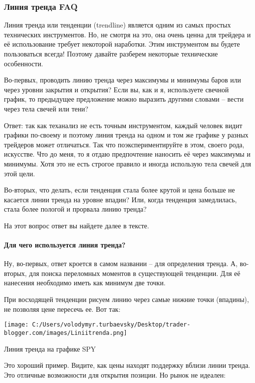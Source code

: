 \documentclass[a5paper]{article}
\begin{document}
\subsubsection{Линия тренда FAQ }

Линия тренда или тенденции (trendline) является одним из самых простых технических инструментов. Но, не смотря на это, она очень ценна для трейдера и её использование требует некоторой наработки. Этим инструментом вы будете пользоваться всегда! Поэтому давайте разберем некоторые технические особенности.

Во-первых, проводить линию тренда через максимумы и минимумы баров или через уровни закрытия и открытия? Если вы, как и я, используете свечной график, то предыдущее предложение можно выразить другими словами – вести через тела свечей или тени?

Ответ: так как теханализ не есть точным инструментом, каждый человек видит графики по-своему и поэтому линия тренда  на одном и том же графике у разных трейдеров может отличаться. Так что поэкспериментируйте в этом, своего рода, искусстве. Что до меня, то я отдаю предпочтение наносить её через максимумы и минимумы. Хотя это не есть строгое правило и иногда использую тела свечей для этой цели.

Во-вторых,  что делать, если тенденция стала более крутой и цена больше не касается линии тренда на уровне впадин? Или, когда тенденция замедлилась, стала более пологой и прорвала линию тренда?

На этот вопрос ответ вы найдете далее в тексте.

\paragraph{Для чего используется линия тренда?}

Ну, во-первых, ответ кроется в самом названии – для определения тренда. А, во-вторых, для поиска переломных моментов в существующей тенденции. Для её нанесения необходимо иметь как минимум две точки.

При восходящей тенденции рисуем линию через самые нижние точки
(впадины), не позволяя цене пересечь ее. Вот так:

\texttt{[image: C:/Users/volodymyr.turbaevsky/Desktop/trader-blogger.com/images/Liniitrenda.png]}

Линия тренда на графике SPY

Это хороший пример. Видите, как цены находят поддержку вблизи линии
тренда. Это отличные возможности для открытия позиции. Но рынок не
идеален:
\end{document}
